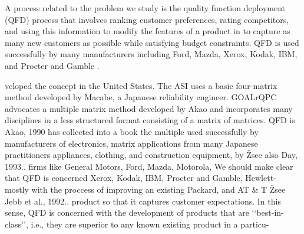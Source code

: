 \documentclass[lotsofwhite]{patmorin}
\begin{document}
A process related to the problem we study is the quality function
deployment (QFD) process that involves ranking customer preferences,
rating competitors, and using this information to modify the features of a
product in to capture as many new customers as possible while satisfying
budget constraints.  QFD is used successfully by many manufacturers
including Ford, Mazda, Xerox, Kodak, IBM, and Procter and Gamble
\cite{jebb et al 1992}.

veloped the concept in the United States. The ASI
                                                     uses a basic
                                                     four-matrix
                                                     method developed
                                                     by Macabe, a
                                                     Japanese reliability
                                                     engineer. GOALrQPC
                                                     advocates a multiple
                                                     matrix method
                                                     developed by Akao
                                                     and incorporates
                                                     many disciplines in
                                                     a less structured
                                                     format consisting of
                                                     a matrix of matrices.
                                             QFD is  Akao, 1990 has
                                             collected into a book
                                             the multiple
used successfully by manufacturers of electronics,   matrix applications
from many Japanese practitioners appliances, clothing, and construction
equipment, by Žsee also Day, 1993..  firms like General Motors, Ford,
Mazda, Motorola,       We should make clear that QFD is concerned Xerox,
Kodak, IBM, Procter and Gamble, Hewlett-      mostly with the proccess
of improving an existing Packard, and AT & T Žsee Jebb et al., 1992..
product so that it captures customer expectations. In
                                                     this sense, QFD
                                                     is concerned with
                                                     the development of
                                                     products that are
                                                     ‘‘best-in-class’’,
                                                     i.e., they are
                                                     superior to any
                                                     known existing
                                                     product in a particu-
\end{document}
